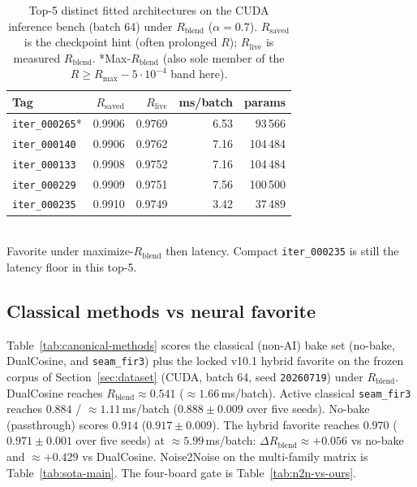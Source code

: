 \begin{table}[t]
  \centering
  \caption{Top-5 distinct fitted architectures on the CUDA inference bench (batch 64) under $R_{\mathrm{blend}}$ ($\alpha{=}0.7$).
  $R_{\mathrm{saved}}$ is the checkpoint hint (often prolonged $R$); $R_{\mathrm{live}}$ is measured $R_{\mathrm{blend}}$.
  *Max-$R_{\mathrm{blend}}$ (also sole member of the $R\ge R_{\max}-5\cdot10^{-4}$ band here).}
  \label{tab:top5}
  \setlength{\tabcolsep}{3pt}
  \begin{tabular}{@{}lrrrr@{}}
    \toprule
    Tag & $R_{\mathrm{saved}}$ & $R_{\mathrm{live}}$ & ms/batch & params \\
    \midrule
    \texttt{iter\_000265}* & 0.9906 & 0.9769 & 6.53 & 93\,566 \\
    \texttt{iter\_000140} & 0.9906 & 0.9762 & 7.16 & 104\,484 \\
    \texttt{iter\_000133} & 0.9908 & 0.9752 & 7.16 & 104\,484 \\
    \texttt{iter\_000229} & 0.9909 & 0.9751 & 7.56 & 100\,500 \\
    \texttt{iter\_000235} & 0.9910 & 0.9749 & 3.42 & 37\,489 \\
    \bottomrule
  \end{tabular}\\[0.4em]
  {\footnotesize *Favorite under maximize-$R_{\mathrm{blend}}$ then latency. Compact \texttt{iter\_000235} is still the latency floor in this top-5.}
\end{table}

\subsection{Classical methods vs neural favorite}
\label{sec:classical-vs-favorite}
Table~\ref{tab:canonical-methods} scores the classical (non-AI) bake set (no-bake, DualCosine, and \texttt{seam\_fir3}) plus the locked v10.1 hybrid favorite on the frozen corpus of Section~\ref{sec:dataset} (CUDA, batch 64, seed \texttt{20260719}) under $R_{\mathrm{blend}}$.
DualCosine reaches $R_{\mathrm{blend}}\approx 0.541$ ($\approx 1.66$\,ms/batch).
Active classical \texttt{seam\_fir3} reaches $0.884$ / $\approx 1.11$\,ms/batch ($0.888\pm0.009$ over five seeds).
No-bake (passthrough) scores $0.914$ ($0.917\pm0.009$).
The hybrid favorite reaches $0.970$ ($0.971\pm0.001$ over five seeds) at $\approx 5.99$\,ms/batch:
$\Delta R_{\mathrm{blend}} \approx {+}0.056$ vs no-bake and $\approx {+}0.429$ vs DualCosine.
Noise2Noise on the multi-family matrix is Table~\ref{tab:sota-main}. The four-board gate is Table~\ref{tab:n2n-vs-ours}.

